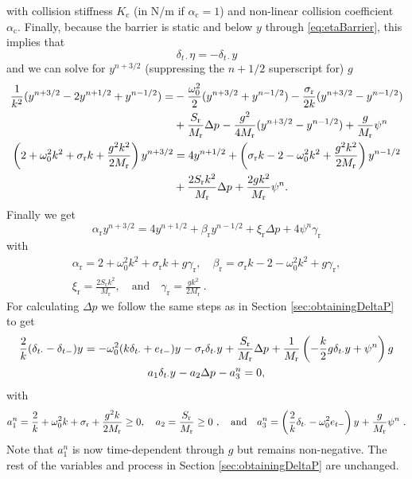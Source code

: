 with collision stiffness $K_\text{c}$ (in N/m if $\alpha_\text{c} = 1$) and non-linear collision coefficient $\alpha_\text{c}$. Finally, because the barrier is static and below $y$ through \eqref{eq:etaBarrier}, this implies that
\begin{equation}\label{eq:etaNegY} 
    \delta_{t\cdot}\eta = -\delta_{t\cdot}y
\end{equation}
and we can solve for $y^{n+3/2}$ (suppressing the $n+1/2$ superscript for) $g$
\begin{align}
    \frac{1}{k^2}(y^{n+3/2} - 2y^{n+1/2} + y^{n-1/2}) = &-\frac{\omega_0^2}{2}(y^{n+3/2}+y^{n-1/2})-\frac{\sigma_\text{r}}{2k}(y^{n+3/2}-y^{n-1/2})\nonumber \\
    &+ \frac{S_\text{r}}{M_\text{r}}\Delta p^{}  -\frac{g^2}{4M_\text{r}}(y^{n+3/2}-y^{n-1/2}) + \frac{g}{M_\text{r}}\psi^n\nonumber\\
    \left(2 + \omega_0^2 k^2 + \sigma_\text{r} k + \frac{g^2k^2}{2M_\text{r}}\right) y^{n+3/2} &= 4y^{n+1/2}+ \left(\sigma_\text{r}k - 2 - \omega_0^2k^2 + \frac{g^2k^2}{2M_\text{r}}\right) y^{n-1/2}\nonumber\\
    &+ \frac{2S_\text{r}k^2}{M_\text{r}}\Delta p^{} + \frac{2gk^2}{M_\text{r}}\psi^n\nonumber.
\end{align}
Finally we get
\begin{equation}\label{eq:lipUpdateWithCollision}
    \alpha_\text{r}y^{n+3/2} = 4 y^{n+1/2} + \beta_\text{r}y^{n-1/2} + \xi_\text{r}\Delta p + 4\psi^n\gamma_\text{r}
\end{equation}
with
\begin{gather}
    \alpha_\text{r} = 2 + \omega_0^2 k^2 + \sigma_\text{r} k + g\gamma_\text{r}, \quad \beta_\text{r} = \sigma_\text{r}k - 2 - \omega_0^2k^2 + g\gamma_\text{r}, \nonumber \\[10pt]
    \xi_\text{r} = \frac{2S_\text{r}k^2}{M_\text{r}}, \quad \text{and} \quad \gamma_\text{r} = \frac{gk^2}{2M_\text{r}}\ .\nonumber
\end{gather}
For calculating $\Delta p$ we follow the same steps as in Section \ref{sec:obtainingDeltaP} to get
\begin{gather}
    \frac{2}{k} (\delta_{t\cdot} - \delta_{t-})y^{} = -\omega_0^2(k\delta_{t\cdot} + e_{t-})y^{} - \sigma_\text{r}\delta_{t\cdot} y^{} + \frac{S_\text{r}}{M_\text{r}}\Delta p^{} + \frac{1}{M_\text{r}}\left(-\frac{k}{2}g\delta_{t\cdot}y+\psi^n\right)g\nonumber\\
    a_1\delta_{t\cdot}y^{} - a_2\Delta p^{} - a_3^n = 0,\label{eq:preAEquation}
\end{gather}
with 
\begin{equation}\label{eq:aColCoeffs}
    a_1^n = \frac{2}{k} + \omega_0^2k + \sigma_\text{r} + \frac{g^2k}{2M_\text{r}} \geq 0, \quad a_2 = \frac{S_\text{r}}{M_\text{r}} \geq 0\ , \quad \text{and} \quad a_3^n = \left(\frac{2}{k} \delta_{t\cdot} - \omega_0^2e_{t-}\right)y^{} + \frac{g}{M_\text{r}}\psi^n\ .
\end{equation}
Note that $a_1^n$ is now time-dependent through $g$ but remains non-negative. The rest of the variables and process in Section \ref{sec:obtainingDeltaP} are unchanged.

